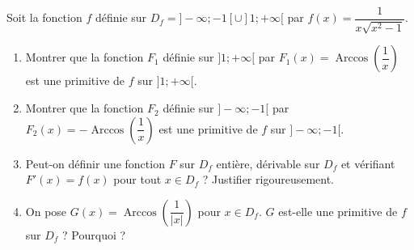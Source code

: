 \documentclass[11pt]{article}
\begin{document}
\begin{exercice}
Soit la fonction $f$ définie sur $D_f = ]-\infty; -1[ \cup ]1; +\infty[$ par $f(x) = \dfrac{1}{x\sqrt{x^2-1}}$.
\begin{enumerate}
    \item Montrer que la fonction $F_1$ définie sur $]1; +\infty[$ par $F_1(x) = \operatorname{Arccos}\left(\dfrac{1}{x}\right)$ est une primitive de $f$ sur $]1; +\infty[$.
    \item Montrer que la fonction $F_2$ définie sur $]-\infty; -1[$ par $F_2(x) = -\operatorname{Arccos}\left(\dfrac{1}{x}\right)$ est une primitive de $f$ sur $]-\infty; -1[$.
    \item Peut-on définir une fonction $F$ sur $D_f$ entière, dérivable sur $D_f$ et vérifiant $F'(x) = f(x)$ pour tout $x \in D_f$ ? Justifier rigoureusement.
    \item On pose $G(x) = \operatorname{Arccos}\left(\dfrac{1}{|x|}\right)$ pour $x \in D_f$. $G$ est-elle une primitive de $f$ sur $D_f$ ? Pourquoi ?
\end{enumerate}
\end{exercice}
\end{document}

